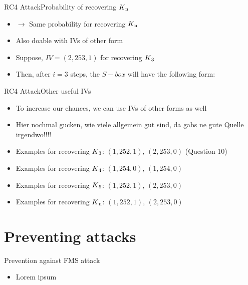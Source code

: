 \documentclass[
	aspectratio=169,	%
	onlytextwidth,		%
	t,					%
	]{beamer}
\begin{document}
\begin{frame}[fragile]{RC4 Attack}{Probability of recovering $K\textsubscript{n}$}
	\begin{itemize}
		\item $\rightarrow$ Same probability for recovering $K\textsubscript{n}$
		\item Also doable with IVs of other form
		\item Suppose, $IV = (2,253,1)$ for recovering $K\textsubscript{3}$
		\item Then, after $i=3$ steps, the $S-box$ will have the following form:
	\end{itemize}
\end{frame}

\begin{frame}[fragile]{RC4 Attack}{Other useful IVs}
	\begin{itemize}
		\item To increase our chances, we can use IVs of other forms as well
		\item Hier nochmal gucken, wie viele allgemein gut sind, da gabs ne gute Quelle irgendwo!!!!
		\item Examples for recovering $K\textsubscript{3}$: $(1,252,1)$, $(2,253,0)$ (Question 10)
		\item Examples for recovering $K\textsubscript{4}$: $(1, 254, 0)$, $(1, 254, 0)$
		\item Examples for recovering $K\textsubscript{5}$: $(1,252,1)$, $(2,253,0)$
		\item Examples for recovering $K\textsubscript{n}$: $(1,252,1)$, $(2,253,0)$
	\end{itemize}
\end{frame}

\section{Preventing attacks}

\begin{frame}[fragile]{Prevention against FMS attack}
	\begin{itemize}
		\item Lorem ipsum
	\end{itemize}
\end{frame}

\appendix
\makethankyou


\section{\appendixname}
\end{document}
